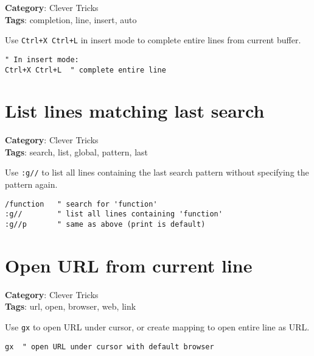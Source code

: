 {{{\textbf{Category}: Clever Tricks\\ \textbf{Tags}: completion, line, insert, auto
\vspace{0.5cm}

Use {\footnotesize \Verb§Ctrl+X Ctrl+L§} in insert mode to complete entire lines from current buffer.

\begin{Exa*}{}
\begin{Verbatim}[fontsize=\footnotesize, breaklines, breakanywhere]
" In insert mode:
Ctrl+X Ctrl+L  " complete entire line
\end{Verbatim}
\end{Exa*}

\section{List lines matching last search}

\textbf{Category}: Clever Tricks\\ \textbf{Tags}: search, list, global, pattern, last
\vspace{0.5cm}

Use {\footnotesize \Verb§:g//§} to list all lines containing the last search pattern without specifying the pattern again.

\begin{Exa*}{}
\begin{Verbatim}[fontsize=\footnotesize, breaklines, breakanywhere]
/function   " search for 'function'
:g//        " list all lines containing 'function'
:g//p       " same as above (print is default)
\end{Verbatim}
\end{Exa*}

\section{Open URL from current line}

\textbf{Category}: Clever Tricks\\ \textbf{Tags}: url, open, browser, web, link
\vspace{0.5cm}

Use {\footnotesize \Verb§gx§} to open URL under cursor, or create mapping to open entire line as URL.

\begin{Exa*}{}
\begin{Verbatim}[fontsize=\footnotesize, breaklines, breakanywhere]
gx  " open URL under cursor with default browser


\end{Verbatim}
\end{Exa*}}}}
